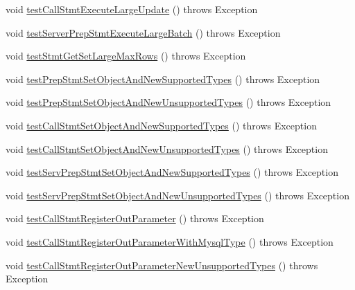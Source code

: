\begin{DoxyCompactItemize}
\item 
void \mbox{\hyperlink{classtestsuite_1_1simple_1_1_statements_test_ade0670c0a2b079707bef4b4c243518c3}{test\+Call\+Stmt\+Execute\+Large\+Update}} ()  throws Exception 
\item 
void \mbox{\hyperlink{classtestsuite_1_1simple_1_1_statements_test_a0436c15b990003b15ded434289c66bfa}{test\+Server\+Prep\+Stmt\+Execute\+Large\+Batch}} ()  throws Exception 
\item 
void \mbox{\hyperlink{classtestsuite_1_1simple_1_1_statements_test_a0b4ba896da3713e9f09a7af0ecf64115}{test\+Stmt\+Get\+Set\+Large\+Max\+Rows}} ()  throws Exception 
\item 
void \mbox{\hyperlink{classtestsuite_1_1simple_1_1_statements_test_aca0d1e60c7b8391bcc8af09b79a01389}{test\+Prep\+Stmt\+Set\+Object\+And\+New\+Supported\+Types}} ()  throws Exception 
\item 
void \mbox{\hyperlink{classtestsuite_1_1simple_1_1_statements_test_af83a1d44591aec497316a9a0fa9f33b5}{test\+Prep\+Stmt\+Set\+Object\+And\+New\+Unsupported\+Types}} ()  throws Exception 
\item 
void \mbox{\hyperlink{classtestsuite_1_1simple_1_1_statements_test_aa04ae89ac45c2ba4a727ed8f60149704}{test\+Call\+Stmt\+Set\+Object\+And\+New\+Supported\+Types}} ()  throws Exception 
\item 
void \mbox{\hyperlink{classtestsuite_1_1simple_1_1_statements_test_a000090a9bbfb5c6ff927a25160cb8042}{test\+Call\+Stmt\+Set\+Object\+And\+New\+Unsupported\+Types}} ()  throws Exception 
\item 
void \mbox{\hyperlink{classtestsuite_1_1simple_1_1_statements_test_a80e61653b55e9a6da8f81dc2ac1bce5a}{test\+Serv\+Prep\+Stmt\+Set\+Object\+And\+New\+Supported\+Types}} ()  throws Exception 
\item 
void \mbox{\hyperlink{classtestsuite_1_1simple_1_1_statements_test_a50dc87eaa732e080fb9d391c753c6b49}{test\+Serv\+Prep\+Stmt\+Set\+Object\+And\+New\+Unsupported\+Types}} ()  throws Exception 
\item 
void \mbox{\hyperlink{classtestsuite_1_1simple_1_1_statements_test_ac1ce052f2d7090889dc501304aebccee}{test\+Call\+Stmt\+Register\+Out\+Parameter}} ()  throws Exception 
\item 
void \mbox{\hyperlink{classtestsuite_1_1simple_1_1_statements_test_ae5a084185b03cb13fa2185bf95b513cf}{test\+Call\+Stmt\+Register\+Out\+Parameter\+With\+Mysql\+Type}} ()  throws Exception 
\item 
void \mbox{\hyperlink{classtestsuite_1_1simple_1_1_statements_test_a24c2a4417a85c41519c9cc3143211bdf}{test\+Call\+Stmt\+Register\+Out\+Parameter\+New\+Unsupported\+Types}} ()  throws Exception 
\end{DoxyCompactItemize}
